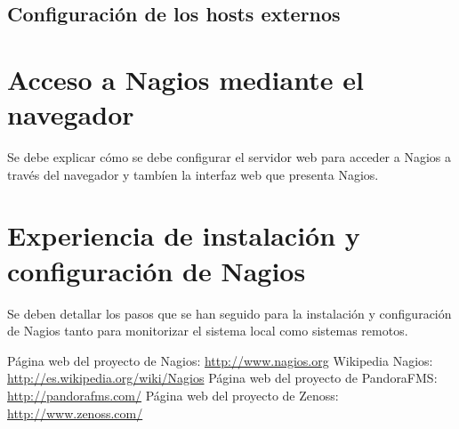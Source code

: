 \documentclass[11pt,a4paper]{article}
\begin{document}
\subsection{Configuración de los hosts externos}



\section{Acceso a Nagios mediante el navegador}

Se debe explicar cómo se debe configurar el servidor web para acceder a Nagios a través del navegador
y  tambíen la interfaz web que presenta Nagios.

\section{Experiencia de instalación y configuración de  Nagios}

Se deben detallar los pasos que se han seguido para la instalación y configuración de Nagios
tanto para monitorizar el sistema local como sistemas remotos.

\begin{thebibliography}{1}

 Página web del proyecto de Nagios: \url{http://www.nagios.org}
 Wikipedia Nagios: \url{http://es.wikipedia.org/wiki/Nagios}
 Página web del proyecto de PandoraFMS: \url{http://pandorafms.com/}
 Página web del proyecto de Zenoss: \url{http://www.zenoss.com/}
\end{thebibliography}
\end{document}
